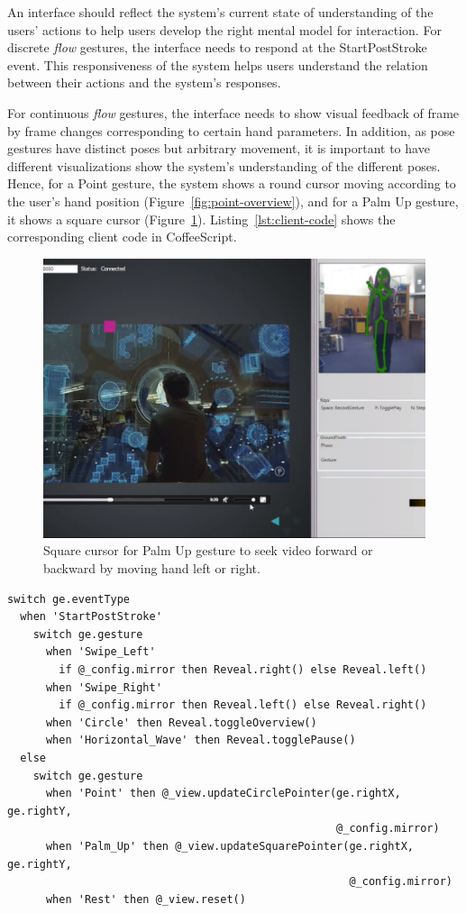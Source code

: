 An interface
should reflect the system's current state of understanding of the users'
actions to help users develop the right mental model for interaction. For
discrete \textit{flow} gestures, the interface needs to respond at the
StartPostStroke event. This responsiveness of the system helps users understand the relation
between their actions and the system's responses. 

For continuous \textit{flow} gestures, the
interface needs to show visual feedback of frame by frame changes
corresponding to certain hand parameters. In addition, as pose gestures
have distinct poses but arbitrary movement, it is important to have different 
visualizations show the system's understanding of the different
poses. Hence, for a Point gesture, the system shows a round cursor moving
according to the user's hand position (Figure~\ref{fig:point-overview}), and for
a Palm Up gesture, it shows a square cursor (Figure~\ref{fig:palm-up}).
Listing~\ref{lst:client-code} shows the corresponding client code in
CoffeeScript.

\begin{figure}[tbh]
\centering
\includegraphics[trim=0 2.7cm 0 0,
clip, width=\columnwidth]{figures/video_control.PNG}
\caption{Square cursor for Palm Up gesture to seek video forward or backward by
moving hand left or right.}
\label{fig:palm-up}
\end{figure}

\begin{lstlisting}[caption={Client code mapping gesture events to actions in
CoffeeScript.}, label={lst:client-code}] 
switch ge.eventType
  when 'StartPostStroke'
    switch ge.gesture
      when 'Swipe_Left'
        if @_config.mirror then Reveal.right() else Reveal.left()
      when 'Swipe_Right'
        if @_config.mirror then Reveal.left() else Reveal.right()
      when 'Circle' then Reveal.toggleOverview()
      when 'Horizontal_Wave' then Reveal.togglePause()
  else
    switch ge.gesture
      when 'Point' then @_view.updateCirclePointer(ge.rightX, ge.rightY,
                                                   @_config.mirror)
      when 'Palm_Up' then @_view.updateSquarePointer(ge.rightX, ge.rightY,
                                                     @_config.mirror)
      when 'Rest' then @_view.reset()
\end{lstlisting}

